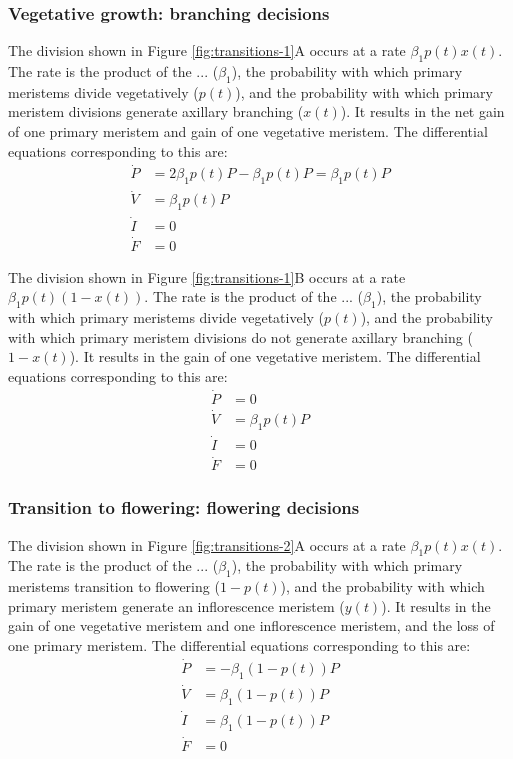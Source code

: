 \documentclass[12pt, oneside]{article}   	%
\begin{document}
\subsubsection*{Vegetative growth: branching decisions}

The division shown in Figure \ref{fig:transitions-1}A occurs at a rate $\beta_1 p(t) x(t)$. The rate is the product of the ... ($\beta_1$), the probability with which primary meristems divide vegetatively ($p(t)$), and the probability with which primary meristem divisions generate axillary branching ($x(t)$). It results in the net gain of one primary meristem and gain of one vegetative meristem. The differential equations corresponding to this are:
%
\begin{align}
\dot{P} & = 2 \beta_1 p(t)  P - \beta_1 p(t) P = \beta_1 p(t) P \nonumber \\
\dot{V} & = \beta_1 p(t)  P      \nonumber \\
\dot{I} & = 0  \nonumber \\
\dot{F} & = 0
\end{align}
%

The division shown in Figure \ref{fig:transitions-1}B occurs at a rate $\beta_1 p(t) ( 1-x(t) )$. The rate is the product of the ... ($\beta_1$), the probability with which primary meristems divide vegetatively ($p(t)$), and the probability with which primary meristem divisions do not generate axillary branching ($1-x(t)$). It results in the gain of one vegetative meristem. The differential equations corresponding to this are:
%
\begin{align}
\dot{P} & = 0 \nonumber \\
\dot{V} & = \beta_1 p(t)  P      \nonumber \\
\dot{I} & = 0  \nonumber \\
\dot{F} & = 0
\end{align}
%


\subsubsection*{Transition to flowering: flowering decisions}

The division shown in Figure \ref{fig:transitions-2}A occurs at a rate $\beta_1 p(t) x(t)$. The rate is the product of the ... ($\beta_1$), the probability with which primary meristems transition to flowering ($1-p(t)$), and the probability with which primary meristem generate an inflorescence meristem ($y(t)$). It results in the gain of one vegetative meristem and one inflorescence meristem, and the loss of one primary meristem. The differential equations corresponding to this are:
%
\begin{align}
\dot{P} & = - \beta_1 ( 1- p(t) ) P \nonumber \\
\dot{V} & = \beta_1 ( 1 - p(t) ) P      \nonumber \\
\dot{I} & = \beta_1 ( 1 - p(t) ) P  \nonumber \\
\dot{F} & = 0
\end{align}
%
\end{document}

